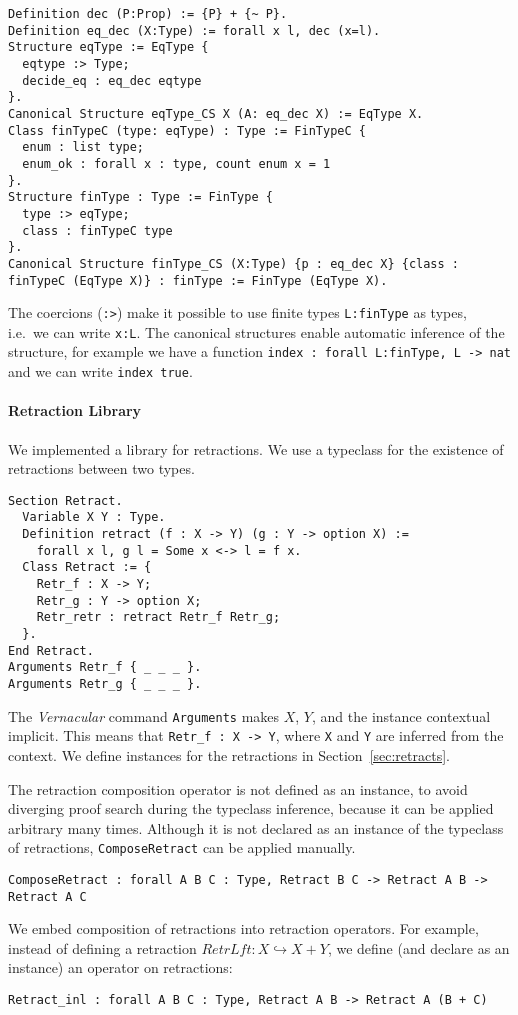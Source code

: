 \begin{lstlisting}
Definition dec (P:Prop) := {P} + {~ P}.
Definition eq_dec (X:Type) := forall x l, dec (x=l).
Structure eqType := EqType {
  eqtype :> Type;
  decide_eq : eq_dec eqtype
}.
Canonical Structure eqType_CS X (A: eq_dec X) := EqType X.
Class finTypeC (type: eqType) : Type := FinTypeC {
  enum : list type;
  enum_ok : forall x : type, count enum x = 1
}.
Structure finType : Type := FinType {
  type :> eqType;
  class : finTypeC type
}.
Canonical Structure finType_CS (X:Type) {p : eq_dec X} {class : finTypeC (EqType X)} : finType := FinType (EqType X).
\end{lstlisting}%

The coercions (\lstinline!:>!) make it possible to use finite types \lstinline{L:finType} as types, i.e.\ we can write \lstinline!x:L!.  The canonical
structures enable automatic inference of the structure, for example we have a function \lstinline!index : forall L:finType, L -> nat! and we can write
\lstinline!index true!.

\paragraph{Retraction Library}

We implemented a library for retractions.  We use a typeclass for the existence of retractions between two types.
\begin{lstlisting}
Section Retract.
  Variable X Y : Type.
  Definition retract (f : X -> Y) (g : Y -> option X) :=
    forall x l, g l = Some x <-> l = f x.
  Class Retract := {
    Retr_f : X -> Y;
    Retr_g : Y -> option X;
    Retr_retr : retract Retr_f Retr_g;
  }.
End Retract.
Arguments Retr_f { _ _ _ }.
Arguments Retr_g { _ _ _ }.
\end{lstlisting}
The \textit{Vernacular} command \lstinline!Arguments! makes $X$, $Y$, and the instance contextual implicit.  This means that
\lstinline!Retr_f : X -> Y!, where \lstinline!X! and \lstinline!Y! are inferred from the context.  We define instances for the retractions in
Section~\ref{sec:retracts}.

The retraction composition operator is not defined as an instance, to avoid diverging proof search during the typeclass inference, because it can be
applied arbitrary many times.  Although it is not declared as an instance of the typeclass of retractions, \lstinline!ComposeRetract! can be applied
manually.
\begin{lstlisting}
ComposeRetract : forall A B C : Type, Retract B C -> Retract A B -> Retract A C
\end{lstlisting}
We embed composition of retractions into retraction operators.  For example, instead of defining a retraction $RetrLft : X \hookrightarrow X+Y$, we
define (and declare as an instance) an operator on retractions:
\begin{lstlisting}
Retract_inl : forall A B C : Type, Retract A B -> Retract A (B + C)
\end{lstlisting}


